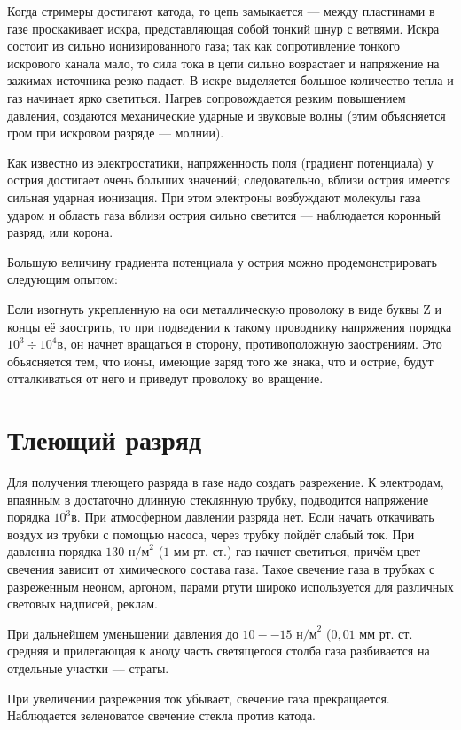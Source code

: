 \documentclass[a4paper,10pt]{book}
\begin{document}
Когда стримеры достигают катода, то цепь замыкается — между пластинами в газе проскакивает искра, представляющая собой тонкий шнур с ветвями. Искра состоит из сильно ионизированного газа; так как сопротивление тонкого искрового канала мало, то сила тока в цепи сильно возрастает и напряжение на зажимах источника резко падает. В искре выделяется большое количество тепла и газ начинает ярко светиться. Нагрев сопровождается резким повышением давления, создаются механические ударные и звуковые волны (этим объясняется гром при искровом разряде — молнии).


Как известно из электростатики, напряженность поля (градиент потенциала) у острия достигает очень больших значений; следовательно, вблизи острия имеется сильная ударная ионизация. При этом электроны возбуждают молекулы газа ударом и область газа вблизи острия сильно светится — наблюдается коронный разряд, или корона.

Большую величину градиента потенциала у острия можно продемонстрировать следующим опытом:

Если изогнуть укрепленную на оси металлическую проволоку в виде буквы Z и концы её заострить, то при подведении к такому проводнику напряжения порядка $10^3 \div 10^4 \textit{в}$, он начнет вращаться в сторону, противоположную заострениям. Это объясняется тем, что ионы, имеющие заряд того же знака, что и острие, будут отталкиваться от него и приведут проволоку во вращение.

\section{Тлеющий разряд}

Для получения тлеющего разряда в газе надо создать разрежение. К электродам, впаянным в достаточно длинную стеклянную трубку, подводится напряжение порядка $10^3 \textit{в}$. При атмосферном давлении разряда нет. Если начать откачивать воздух из трубки с помощью насоса, через трубку пойдёт слабый ток. При давленна порядка $130 \textit{ н/м}^2$ ($1\textit{ мм рт. ст.}$) газ начнет светиться, причём цвет свечения зависит от химического состава газа. Такое свечение газа в трубках с разреженным неоном, аргоном, парами ртути широко используется для различных световых надписей, реклам.

При дальнейшем уменьшении давления до $10 -- 15 \textit{ н/м}^2$ ($0,01\textit{ мм рт. ст.}$ средняя и прилегающая к аноду часть светящегося столба газа разбивается на отдельные участки — страты.

При увеличении разрежения ток убывает, свечение газа прекращается. Наблюдается зеленоватое свечение стекла против катода.
\end{document}
